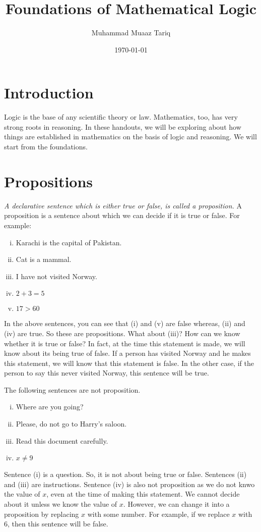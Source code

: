 \documentclass[a4paper]{article}
\title{Foundations of Mathematical Logic}
\author{Muhammad Muaaz Tariq}
\date{\today}
\theoremstyle{definition}
\theoremstyle{definition}
\theoremstyle{definition}
\theoremstyle{definition}
\theoremstyle{definition}
\theoremstyle{definition}
\begin{document}
\maketitle

\section*{Introduction}
Logic is the base of any scientific theory or law. Mathematics, too, has very strong roots in reasoning. In these handouts, we will be exploring about how things are established in mathematics on the basis of logic and reasoning. We will start from the foundations.
 
\section{Propositions}
\textit{A declarative sentence which is either true or false, is called a proposition.} A proposition is a sentence about which we can decide if it is true or false. For example:
\begin{enumerate}[i.]
    \item Karachi is the capital of Pakistan.
    \item Cat is a mammal.
    \item I have not visited Norway.
    \item $2 + 3 = 5$
    \item $ 17 > 60$
\end{enumerate}
In the above sentences, you can see that (i) and (v) are false whereas, (ii) and (iv) are true. So these are propositions. What about (iii)? How can we know whether it is true or false? In fact, at the time this statement is made, we will know about its being true of false. If a person has visited Norway and he makes this statement, we will know that this statement is false. In the other case, if the person to say this never visited Norway, this sentence will be true.


The following sentences are not proposition.
\begin{enumerate}[i.]
    \item Where are you going?
    \item Please, do not go to Harry's saloon.
    \item Read this document carefully.
    \item $x \neq 9$
\end{enumerate}
Sentence (i) is a question. So, it is not about being true or false. Sentences (ii) and (iii) are instructions. Sentence (iv) is also not proposition as we do not knwo the value of $x$, even at the time of making this statement. We cannot decide about it unless we know the value of $x$. However, we can change it into a proposition by replacing $x$ with some number. For example, if we replace $x$ with 6, then this sentence will be false.
\end{document}
